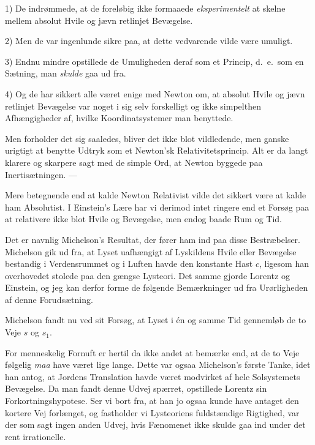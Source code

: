 \documentclass[12pt,a4paper]{article}
\newcommand{\opage}[1]{\marginnote{\footnotesize\textit{[#1]}}}
\begin{document}
1) De indrømmede, at de foreløbig ikke formaaede \emph{eksperimentelt} at
skelne mellem absolut Hvile og jævn retlinjet Bevægelse.

\opage{197} 2) Men de var ingenlunde sikre paa, at dette vedvarende vilde være umuligt.

3) Endnu mindre opstillede de Umuligheden deraf som et Princip, d.\ e.\ som en
Sætning, man \emph{skulde} gaa ud fra.

4) Og de har sikkert alle været enige med Newton om, at absolut Hvile og jævn
retlinjet Bevægelse var noget i sig selv forskelligt og ikke simpelthen
Afhængigheder af, hvilke Koordinatsystemer man benyttede.

Men forholder det sig saaledes, bliver det ikke blot vildledende, men ganske
urigtigt at benytte Udtryk som \guillemotleft et Newton'sk
Relativitetsprincip\guillemotright. Alt er da langt klarere og skarpere sagt
med de simple Ord, at Newton byggede paa Inertisætningen. ---

Mere betegnende end at kalde Newton Relativist vilde det sikkert være at kalde
ham Absolutist. I Einstein's Lære har vi derimod intet ringere end et Forsøg
paa at relativere ikke blot Hvile og Bevægelse, men endog baade Rum og Tid.

Det er navnlig Michelson's Resultat, der fører ham ind paa disse Bestræbelser.
Michelson gik ud fra, at Lyset uafhængigt af Lyskildens Hvile eller Bevægelse
bestandig i Verdensrummet og i Luften havde den konstante Hast $c$, ligesom
han overhovedet stolede paa den gængse Lysteori. Det samme gjorde Lorentz og
Einstein, og jeg kan derfor forme de følgende Bemærkninger ud fra Urørligheden
af denne Forudsætning.

Michelson fandt nu ved sit Forsøg, at Lyset i én og samme Tid gennemløb de to
Veje $s$ og $s_{1}$.

For menneskelig Fornuft er hertil da ikke andet at bemærke end, at de to Veje
følgelig \emph{maa} have været lige lange. Dette var ogsaa Michelson's første
Tanke, idet han antog, at Jordens Translation havde været modvirket af hele
Solsystemets Bevægelse. Da man fandt denne Udvej spærret, opstillede Lorentz
sin Forkortningshypotese. Ser vi bort fra, at han jo ogsaa kunde have antaget
den kortere Vej forlænget, og fastholder vi Lysteoriens fuldstændige Rigtighed,
var der som sagt ingen anden Udvej, hvis Fænomenet ikke skulde gaa ind under
det rent irrationelle.
\end{document}
